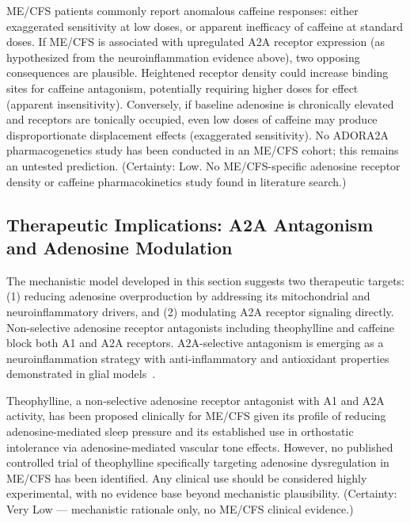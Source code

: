 \begin{speculation}
\label{spec:ch15-caffeine-paradox}
ME/CFS patients commonly report anomalous caffeine responses: either exaggerated sensitivity at low doses, or apparent inefficacy of caffeine at standard doses. If ME/CFS is associated with upregulated A2A receptor expression (as hypothesized from the neuroinflammation evidence above), two opposing consequences are plausible. Heightened receptor density could increase binding sites for caffeine antagonism, potentially requiring higher doses for effect (apparent insensitivity). Conversely, if baseline adenosine is chronically elevated and receptors are tonically occupied, even low doses of caffeine may produce disproportionate displacement effects (exaggerated sensitivity). No ADORA2A pharmacogenetics study has been conducted in an ME/CFS cohort; this remains an untested prediction.
(Certainty: Low. No ME/CFS-specific adenosine receptor density or caffeine pharmacokinetics study found in literature search.)
\end{speculation}

\subsection{Therapeutic Implications: A2A Antagonism and Adenosine Modulation}

The mechanistic model developed in this section suggests two therapeutic targets: (1) reducing adenosine overproduction by addressing its mitochondrial and neuroinflammatory drivers, and (2) modulating A2A receptor signaling directly. Non-selective adenosine receptor antagonists including theophylline and caffeine block both A1 and A2A receptors. A2A-selective antagonism is emerging as a neuroinflammation strategy with anti-inflammatory and antioxidant properties demonstrated in glial models~\cite{Navia2020AdenosineReceptors}.

\begin{speculation}
\label{spec:ch15-theophylline}
Theophylline, a non-selective adenosine receptor antagonist with A1 and A2A activity, has been proposed clinically for ME/CFS given its profile of reducing adenosine-mediated sleep pressure and its established use in orthostatic intolerance via adenosine-mediated vascular tone effects. However, no published controlled trial of theophylline specifically targeting adenosine dysregulation in ME/CFS has been identified. Any clinical use should be considered highly experimental, with no evidence base beyond mechanistic plausibility.
(Certainty: Very Low --- mechanistic rationale only, no ME/CFS clinical evidence.)
\end{speculation}

